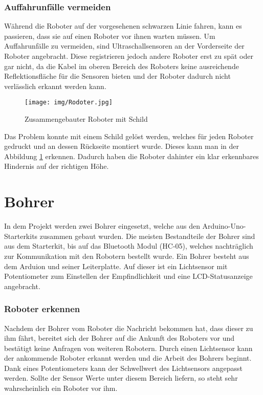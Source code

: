 \subsubsection{Auffahrunfälle vermeiden}
Während die Roboter auf der vorgesehenen schwarzen Linie fahren, kann es passieren, dass sie auf einen Roboter vor ihnen warten müssen. Um Auffahrunfälle zu vermeiden, sind Ultraschallsensoren an der Vorderseite der Roboter angebracht. Diese registrieren jedoch andere Roboter erst zu spät oder gar nicht, da die Kabel im oberen Bereich des Roboters keine ausreichende Reflektionsfläche für die Sensoren bieten und der Roboter dadurch nicht verlässlich erkannt werden kann.
\begin{figure}[h]
\begin{center}
\texttt{[image: img/Rodoter.jpg]}
\caption{Zusammengebauter Roboter mit Schild} \label{rodoter_img}
\end{center}
\end{figure}
Das Problem konnte mit einem Schild gelöst werden, welches für jeden Roboter gedruckt und an dessen Rückseite montiert wurde. Dieses kann man in der Abbildung \ref{rodoter_img} erkennen. Dadurch haben die Roboter dahinter ein klar erkennbares Hindernis auf der richtigen Höhe.

\section{Bohrer}
In dem Projekt werden zwei Bohrer eingesetzt, welche aus den Arduino-Uno-Starterkits zusammen gebaut wurden. Die meisten Bestandteile der Bohrer sind aus dem Starterkit, bis auf das Bluetooth Modul (HC-05), welches nachträglich zur Kommunikation mit den Robotern bestellt wurde. Ein Bohrer besteht aus dem Arduion und seiner Leiterplatte. Auf dieser ist ein Lichtsensor mit Potentiometer zum Einstellen der Empfindlichkeit und eine LCD-Statusanzeige angebracht.

\subsubsection{Roboter erkennen}
Nachdem der Bohrer vom Roboter die Nachricht bekommen hat, dass dieser zu ihm fährt, bereitet sich der Bohrer auf die Ankunft des Roboters vor und bestätigt keine Anfragen von weiteren Robotern. Durch einen Lichtsensor kann der ankommende Roboter erkannt werden und die Arbeit des Bohrers beginnt. Dank eines Potentiometers kann der Schwellwert des Lichtsensors angepasst werden. Sollte der Sensor Werte unter diesem Bereich liefern, so steht sehr wahrscheinlich ein Roboter vor ihm.

